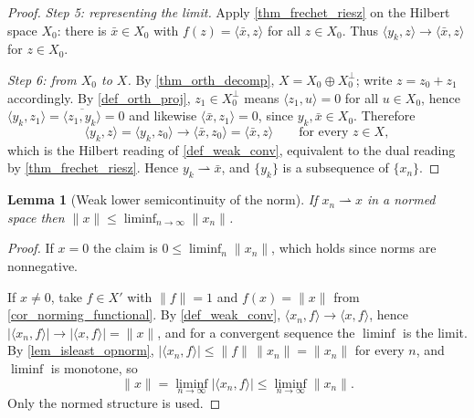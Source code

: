 \documentclass[a4paper]{report}
\theoremstyle{plain}
\newtheorem{lemma}[theorem]{Lemma}
\theoremstyle{definition}
\theoremstyle{remark}
\begin{document}
\begin{proof}
  \emph{Step 5: representing the limit.}  Apply \cref{thm_frechet_riesz} on the Hilbert
  space $X_0$: there is $\bar x \in X_0$ with $f(z) = \langle \bar x, z\rangle$ for all
  $z \in X_0$.  Thus $\langle y_k, z\rangle \to \langle \bar x, z\rangle$ for $z \in X_0$.

  \emph{Step 6: from $X_0$ to $X$.}  By \cref{thm_orth_decomp},
  $X = X_0 \oplus X_0^\perp$; write $z = z_0 + z_1$ accordingly.  By
  \cref{def_orth_proj}, $z_1 \in X_0^\perp$ means $\langle z_1,u\rangle = 0$ for all
  $u \in X_0$, hence $\langle y_k,z_1\rangle = \overline{\langle z_1,y_k\rangle} = 0$ and
  likewise $\langle \bar x, z_1\rangle = 0$, since $y_k,\bar x \in X_0$.  Therefore
  \[
    \langle y_k, z\rangle = \langle y_k, z_0\rangle
      \longrightarrow \langle \bar x, z_0\rangle = \langle \bar x, z\rangle
      \qquad \text{for every } z \in X,
  \]
  which is the Hilbert reading of \cref{def_weak_conv}, equivalent to the dual reading by
  \cref{thm_frechet_riesz}.  Hence $y_k \rightharpoonup \bar x$, and $\{y_k\}$ is a
  subsequence of $\{x_n\}$.
\end{proof}



\begin{lemma}[Weak lower semicontinuity of the norm]
  \label{lem_weak_lsc}
  If $x_n \rightharpoonup x$ in a normed space then
  $\|x\| \le \liminf_{n\to\infty}\|x_n\|$.
\end{lemma}
\begin{proof}
  If $x = 0$ the claim is $0 \le \liminf_n\|x_n\|$, which holds since norms are
  nonnegative.

  If $x \ne 0$, take $f \in X'$ with $\|f\| = 1$ and $f(x) = \|x\|$ from
  \cref{cor_norming_functional}.  By \cref{def_weak_conv},
  $\langle x_n,f\rangle \to \langle x,f\rangle$, hence
  $|\langle x_n,f\rangle| \to |\langle x,f\rangle| = \|x\|$, and for a convergent sequence
  the $\liminf$ is the limit.  By \cref{lem_isleast_opnorm},
  $|\langle x_n,f\rangle| \le \|f\|\,\|x_n\| = \|x_n\|$ for every $n$, and $\liminf$ is
  monotone, so
  \[
    \|x\| = \liminf_{n\to\infty}|\langle x_n,f\rangle| \le \liminf_{n\to\infty}\|x_n\| .
  \]
  Only the normed structure is used.
\end{proof}
\end{document}
